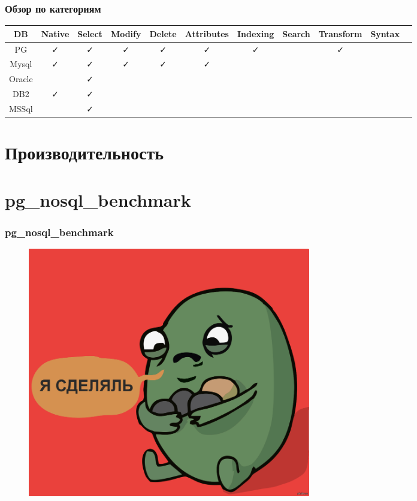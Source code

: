 \documentclass[14pt, compress, aspectratio=169]{beamer}
\def\check{\textcolor{check}{\FA \faCheck}}
\def\fail{\textcolor{fail}{\FA \faRemove}}
\def\question{\textcolor{question}{\FA \faSearch}}
\begin{document}
\begin{frame}[fragile]
    \frametitle{Обзор по категориям}

    \begin{adjustbox}{max totalsize={1.1\textwidth}{2.0\textheight},center}
        \begin{tabular}{c | c | c | c | c | c | c | c | c | c | c}
            DB & Native & Select & Modify & Delete & Attributes & Indexing & Search & Transform & Syntax \\
            \hline
            PG & \check & \check & \check & \check & \check & \check & \question & \check & \question \\
            Mysql & \check & \check & \check & \check & \check & \question & \question & \fail & \question \\
            Oracle & \fail & \check & \fail & \fail & \fail & \fail & \question & \question & \question \\
            DB2 & \check & \check & \fail & \fail & \fail & \fail & \fail & \question & \fail \\
            MSSql & \fail & \check & \fail & \fail & \fail & \fail & \question & \question & \fail \\
        \end{tabular}
    \end{adjustbox}
\end{frame}

\section{Производительность}

\section{pg\_nosql\_benchmark}

\begin{frame}[fragile]
    \frametitle{pg\_nosql\_benchmark}
    \vspace{-35pt}
    \begin{figure}
        \includegraphics[width=0.6\textwidth,center]{i_made.jpg}
    \end{figure}
\end{frame}
\end{document}
